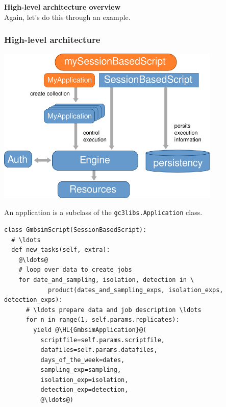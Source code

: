 \documentclass[english,serif,mathserif,xcolor=pdftex,dvipsnames,table]{beamer}
\begin{document}
\begin{frame}
  \begin{center}
    {\bfseries\huge
      {High-level architecture overview}}
    \\ \+
    Again, let's do this through an example.
  \end{center}
\end{frame}


\begin{frame}
  \frametitle{High-level architecture}
  \includegraphics[width=0.8\textwidth]{fig/GC3Pie_execution_model}
\end{frame}

\begin{frame}[fragile]
  \begin{center}
    An application is a subclass of the \texttt{gc3libs.Application}
    class.
  \end{center}
  \begin{lstlisting}[showstringspaces=false,basicstyle=\tiny\ttfamily]
class GmbsimScript(SessionBasedScript):
  # \ldots
  def new_tasks(self, extra):
    @\ldots@
    # loop over data to create jobs
    for date_and_sampling, isolation, detection in \
            product(dates_and_sampling_exps, isolation_exps, detection_exps):
      # \ldots prepare data and job description \ldots
      for n in range(1, self.params.replicates):
        yield @\HL{GmbsimApplication}@(
          scriptfile=self.params.scriptfile,
          datafiles=self.params.datafiles,
          days_of_the_week=dates,
          sampling_exp=sampling,
          isolation_exp=isolation,
          detection_exp=detection,
          @\ldots@)
\end{lstlisting}
\end{frame}
\end{document}
